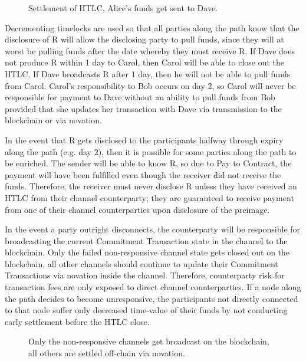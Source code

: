 \documentclass[letterpaper,11pt]{article}
\begin{document}
\begin{figure}[H]
	\caption{Settlement of HTLC, Alice's funds get sent to Dave.
	}
\end{figure}

Decrementing timelocks are used so that all parties along the path know that
the disclosure of R will allow the disclosing party to pull funds, since they
will at worst be pulling funds after the date whereby they must receive R. If
Dave does not produce R within 1 day to Carol, then Carol will be able to close
out the HTLC. If Dave broadcasts R after 1 day, then he will not be able to pull
funds from Carol. Carol's responsibility to Bob occurs on day 2, so Carol will
never be responsible for payment to Dave without an ability to pull funds from
Bob provided that she updates her transaction with Dave via transmission to the
blockchain or via novation.

In the event that R gets disclosed to the participants halfway through expiry
along the path (e.g. day 2), then it is possible for some parties along the
path to be enriched. The sender will be able to know R, so due to Pay to
Contract, the payment will have been fulfilled even though the receiver did not
receive the funds. Therefore, the receiver must never disclose R unless they
have received an HTLC from their channel counterparty; they are guaranteed to
receive payment from one of their channel counterparties upon disclosure of the
preimage.

In the event a party outright disconnects, the counterparty will be responsible
for broadcasting the current Commitment Transaction state in the channel to the
blockchain. Only the failed non-responsive channel state gets closed out on the
blockchain, all other channels should continue to update their Commitment
Transactions via novation inside the channel. Therefore, counterparty risk for
transaction fees are only exposed to direct channel counterparties. If a node
along the path decides to become unresponsive, the participants not directly
connected to that node suffer only decreased time-value of their funds by not
conducting early settlement before the HTLC close.

\begin{figure}[H]
	\caption{Only the non-responsive channels get broadcast on the
		blockchain, all others are settled off-chain via novation.
	}
\end{figure}
\end{document}
